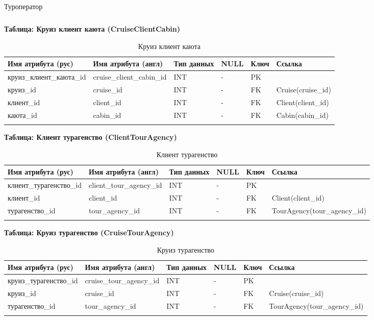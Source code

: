 \documentclass[11pt,a4paper,final]{article}
\begin{document}
\begin{landscape}
\begin{longtable}{|p{4cm}|p{3.4cm}|p{2.6cm}|p{1cm}|p{1cm}|p{4.2cm}|}
\caption{Туроператор}
\end{longtable}

\newpage
    \ClearShipoutPicture %
    \thispagestyle{empty}
\textbf{Таблица: Круиз клиент каюта (CruiseClientCabin)}

\begin{longtable}{|p{4.7cm}|p{4cm}|p{1.4cm}|p{1cm}|p{1cm}|p{3.5cm}|}
\hline
Имя атрибута (рус) & Имя атрибута (англ) & Тип данных & NULL & Ключ & Ссылка \\ \hline
\endhead

круиз\_клиент\_каюта\_id & cruise\_client\_cabin\_id & INT & - & PK & \\ \hline
круиз\_id & cruise\_id & INT & - & FK & Cruise(cruise\_id) \\ \hline
клиент\_id & client\_id & INT & - & FK & Client(client\_id) \\ \hline
каюта\_id & cabin\_id & INT & - & FK & Cabin(cabin\_id) \\ \hline

\caption{Круиз клиент каюта}
\end{longtable}

\textbf{Таблица: Клиент турагенство (ClientTourAgency)}

\begin{longtable}{|p{4.2cm}|p{4cm}|p{1.4cm}|p{1cm}|p{1cm}|p{5.2cm}|}
\hline
Имя атрибута (рус) & Имя атрибута (англ) & Тип данных & NULL & Ключ & Ссылка \\ \hline
\endhead

клиент\_турагенство\_id & client\_tour\_agency\_id & INT & - & PK & \\ \hline
клиент\_id & client\_id & INT & - & FK & Client(client\_id) \\ \hline
турагенство\_id & tour\_agency\_id & INT & - & FK & TourAgency(tour\_agency\_id) \\ \hline

\caption{Клиент турагенство}
\end{longtable}


\textbf{Таблица: Круиз турагенство (CruiseTourAgency)}

\begin{longtable}{|p{4cm}|p{4cm}|p{1.4cm}|p{1cm}|p{1cm}|p{5.5cm}|}
\hline
Имя атрибута (рус) & Имя атрибута (англ) & Тип данных & NULL & Ключ & Ссылка \\ \hline
\endhead

круиз\_турагенство\_id & cruise\_tour\_agency\_id & INT & - & PK & \\ \hline
круиз\_id & cruise\_id & INT & - & FK & Cruise(cruise\_id) \\ \hline
турагенство\_id & tour\_agency\_id & INT & - & FK & TourAgency(tour\_agency\_id) \\ \hline

\caption{Круиз турагенство}
\end{longtable}
\end{landscape}
\end{document}
